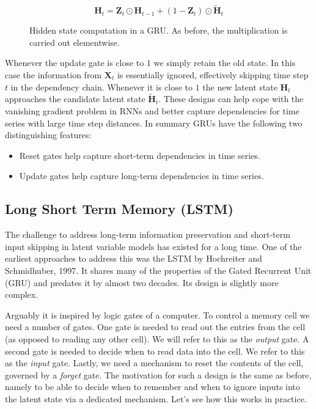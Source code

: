 $$\mathbf{H}_t = \mathbf{Z}_t \odot \mathbf{H}_{t-1}  + (1 - \mathbf{Z}_t) \odot \tilde{\mathbf{H}}_t$$

\begin{figure}[hpt]
	\centering
	
	\caption{Hidden state computation in a GRU. As before, the multiplication is carried out elementwise.}
	\label{fig:gru_3}
\end{figure}

Whenever the update gate is close to $1$ we simply retain the old state. In this case the information from $\mathbf{X}_t$ is essentially ignored, effectively skipping time step $t$ in the dependency chain. Whenever it is close to $1$ the new latent state $\mathbf{H}_t$ approaches the candidate latent state $\tilde{\mathbf{H}}_t$. These designs can help cope with the vanishing gradient problem in RNNs and better capture dependencies for time series with large time step distances. In summary GRUs have the following two distinguishing features:

\begin{itemize}
    \item Reset gates help capture short-term dependencies in time series.
    \item Update gates help capture long-term dependencies in time series.
\end{itemize}

\subsection{Long Short Term Memory (LSTM)}\label{subsec:lstm}

The challenge to address long-term information preservation and short-term input skipping in latent variable models has existed for a long time. One of the earliest approaches to address this was the LSTM by Hochreiter and Schmidhuber, 1997. It shares many of the properties of the Gated Recurrent Unit (GRU) and predates it by almost two decades. Its design is slightly more complex.

Arguably it is inspired by logic gates of a computer. To control a memory cell we need a number of gates. One gate is needed to read out the entries from the cell (as opposed to reading any other cell). We will refer to this as the \textit{output} gate. A second gate is needed to decide when to read data into the cell. We refer to this as the \textit{input} gate. Lastly, we need a mechanism to reset the contents of the cell, governed by a \textit{forget} gate. The motivation for such a design is the same as before, namely to be able to decide when to remember and when to ignore inputs into the latent state via a dedicated mechanism. Let’s see how this works in practice.

